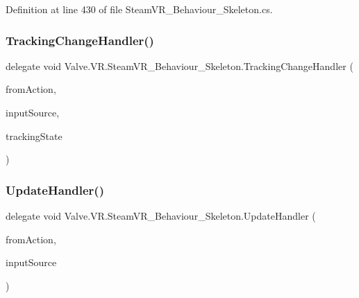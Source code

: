 Definition at line 430 of file Steam\+V\+R\+\_\+\+Behaviour\+\_\+\+Skeleton.\+cs.

\mbox{\label{class_valve_1_1_v_r_1_1_steam_v_r___behaviour___skeleton_a473b611af60d6c89ba50e62833c23cd8}} 
\subsubsection{\texorpdfstring{TrackingChangeHandler()}{TrackingChangeHandler()}}
{\footnotesize\ttfamily delegate void Valve.\+V\+R.\+Steam\+V\+R\+\_\+\+Behaviour\+\_\+\+Skeleton.\+Tracking\+Change\+Handler (\begin{DoxyParamCaption}\item[{\mbox{\hyperlink{class_valve_1_1_v_r_1_1_steam_v_r___behaviour___skeleton}{Steam\+V\+R\+\_\+\+Behaviour\+\_\+\+Skeleton}}}]{from\+Action,  }\item[{\mbox{\hyperlink{namespace_valve_1_1_v_r_a82e5bf501cc3aa155444ee3f0662853f}{Steam\+V\+R\+\_\+\+Input\+\_\+\+Sources}}}]{input\+Source,  }\item[{\mbox{\hyperlink{namespace_valve_1_1_v_r_abe6feab98f33191b7c27b4292012e90a}{E\+Tracking\+Result}}}]{tracking\+State }\end{DoxyParamCaption})}

\mbox{\label{class_valve_1_1_v_r_1_1_steam_v_r___behaviour___skeleton_aca86be067e5094667bce3ba86677dd0b}} 
\subsubsection{\texorpdfstring{UpdateHandler()}{UpdateHandler()}}
{\footnotesize\ttfamily delegate void Valve.\+V\+R.\+Steam\+V\+R\+\_\+\+Behaviour\+\_\+\+Skeleton.\+Update\+Handler (\begin{DoxyParamCaption}\item[{\mbox{\hyperlink{class_valve_1_1_v_r_1_1_steam_v_r___behaviour___skeleton}{Steam\+V\+R\+\_\+\+Behaviour\+\_\+\+Skeleton}}}]{from\+Action,  }\item[{\mbox{\hyperlink{namespace_valve_1_1_v_r_a82e5bf501cc3aa155444ee3f0662853f}{Steam\+V\+R\+\_\+\+Input\+\_\+\+Sources}}}]{input\+Source }\end{DoxyParamCaption})}

